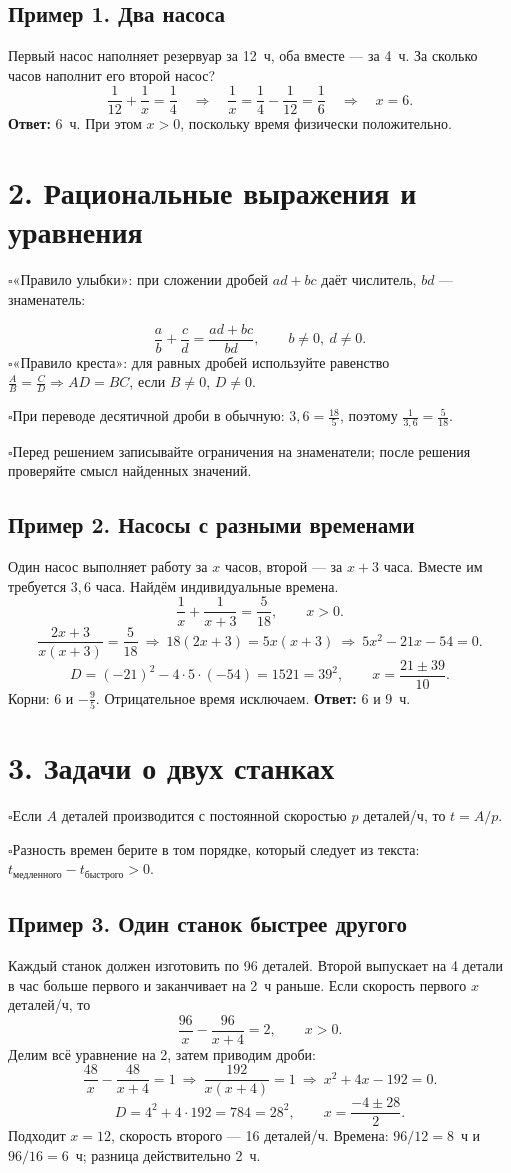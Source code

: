 \documentclass[a4paper,12pt]{article}
\newcommand{\checkitem}[1]{\noindent\(\square\)\enspace #1\par}
\newcommand{\keyterm}[1]{{\color{darkaccent}\textbf{#1}}}
\begin{document}
\subsection*{Пример 1. Два насоса}
Первый насос наполняет резервуар за 12~ч, оба вместе --- за 4~ч. За сколько часов наполнит его второй насос?
\[
\frac1{12}+\frac1x=\frac14
\quad\Longrightarrow\quad
\frac1x=\frac14-\frac1{12}=\frac16
\quad\Longrightarrow\quad x=6.
\]
\keyterm{Ответ:} 6~ч. При этом \(x>0\), поскольку время физически положительно.

\section*{2. Рациональные выражения и уравнения}
\checkitem{«Правило улыбки»: при сложении дробей \(ad+bc\) даёт числитель, \(bd\) --- знаменатель:}
\[
\boxed{\frac ab+\frac cd=\frac{ad+bc}{bd}},\qquad b\ne0,\ d\ne0.
\]
\checkitem{«Правило креста»: для равных дробей используйте равенство \(\frac AB=\frac CD\Rightarrow AD=BC\), если \(B\ne0\), \(D\ne0\).}
\checkitem{При переводе десятичной дроби в обычную: \(3{,}6=\frac{18}{5}\), поэтому \(\frac1{3{,}6}=\frac5{18}\).}
\checkitem{Перед решением записывайте ограничения на знаменатели; после решения проверяйте смысл найденных значений.}

\subsection*{Пример 2. Насосы с разными временами}
Один насос выполняет работу за \(x\) часов, второй --- за \(x+3\) часа. Вместе им требуется \(3{,}6\) часа. Найдём индивидуальные времена.
\[
\frac1x+\frac1{x+3}=\frac5{18},\qquad x>0.
\]
\[
\frac{2x+3}{x(x+3)}=\frac5{18}
\ \Longrightarrow\ 18(2x+3)=5x(x+3)
\ \Longrightarrow\ 5x^2-21x-54=0.
\]
\[
D=(-21)^2-4\cdot5\cdot(-54)=1521=39^2,
\qquad x=\frac{21\pm39}{10}.
\]
Корни: \(6\) и \(-\frac95\). Отрицательное время исключаем. \keyterm{Ответ:} 6 и 9~ч.

\section*{3. Задачи о двух станках}
\checkitem{Если \(A\) деталей производится с постоянной скоростью \(p\) деталей/ч, то \(t=A/p\).}
\checkitem{Разность времен берите в том порядке, который следует из текста: \(t_{\text{медленного}}-t_{\text{быстрого}}>0\).}
\subsection*{Пример 3. Один станок быстрее другого}
Каждый станок должен изготовить по 96 деталей. Второй выпускает на 4 детали в час больше первого и заканчивает на 2~ч раньше. Если скорость первого \(x\) деталей/ч, то
\[
\frac{96}{x}-\frac{96}{x+4}=2,\qquad x>0.
\]
Делим всё уравнение на 2, затем приводим дроби:
\[
\frac{48}{x}-\frac{48}{x+4}=1
\ \Longrightarrow\ \frac{192}{x(x+4)}=1
\ \Longrightarrow\ x^2+4x-192=0.
\]
\[
D=4^2+4\cdot192=784=28^2,\qquad
x=\frac{-4\pm28}{2}.
\]
Подходит \(x=12\), скорость второго --- 16 деталей/ч. Времена: \(96/12=8\)~ч и \(96/16=6\)~ч; разница действительно 2~ч.
\end{document}
